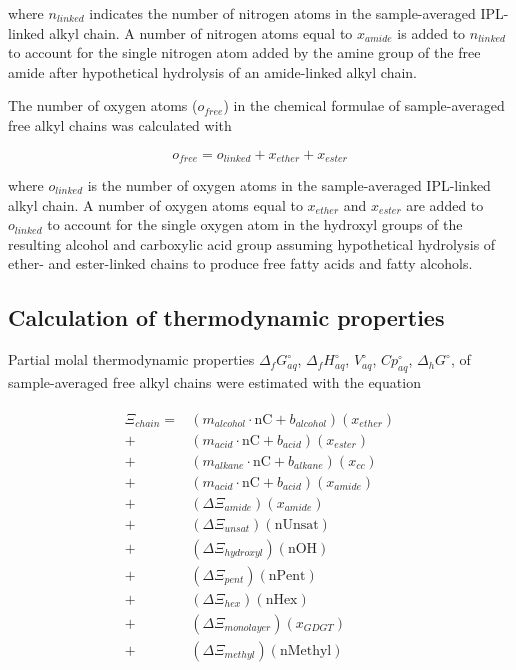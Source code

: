 \noindent where $n_{linked}$ indicates the number of nitrogen atoms in the sample-averaged IPL-linked alkyl chain. A number of nitrogen atoms equal to $x_{amide}$ is added to $n_{linked}$ to account for the single nitrogen atom added by the amine group of the free amide after hypothetical hydrolysis of an amide-linked alkyl chain.

The number of oxygen atoms ($o_{free}$) in the chemical formulae of sample-averaged free alkyl chains was calculated with

\begin{equation}
    o_{free} = o_{linked} + x_{ether} + x_{ester}
\end{equation}

\noindent where $o_{linked}$ is the number of oxygen atoms in the sample-averaged IPL-linked alkyl chain. A number of oxygen atoms equal to $x_{ether}$ and $x_{ester}$ are added to $o_{linked}$ to account for the single oxygen atom in the hydroxyl groups of the resulting alcohol and carboxylic acid group assuming hypothetical hydrolysis of ether- and ester-linked chains to produce free fatty acids and fatty alcohols.

\subsection{Calculation of thermodynamic properties}
Partial molal thermodynamic properties $\Delta_{f}G_{aq}^{\circ}$, $\Delta_{f}H_{aq}^{\circ}$, $V_{aq}^{\circ}$, $Cp_{aq}^{\circ}$, $\Delta_{h}G^{\circ}$, of sample-averaged free alkyl chains were estimated with the equation

\begin{align}
\begin{split}
\Xi_{chain} = & (m_{alcohol}\cdot \text{nC} + b_{alcohol})(x_{ether}) \\
            + & (m_{acid}\cdot \text{nC} + b_{acid})(x_{ester}) \\
            + & (m_{alkane}\cdot \text{nC} + b_{alkane})(x_{cc}) \\
            + & (m_{acid}\cdot \text{nC} + b_{acid})(x_{amide}) \\
            + & (\Delta\Xi_{amide})(x_{amide}) \\
            + & (\Delta\Xi_{unsat})(\text{nUnsat}) \\
            + & (\Delta\Xi_{hydroxyl})(\text{nOH}) \\
            + & (\Delta\Xi_{pent})(\text{nPent}) \\
            + & (\Delta\Xi_{hex})(\text{nHex}) \\
            + & (\Delta\Xi_{monolayer})(x_{GDGT}) \\
            + & (\Delta\Xi_{methyl})(\text{nMethyl}) \\
\end{split}
\end{align}



